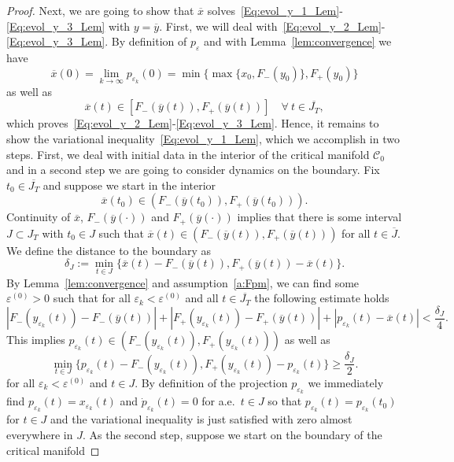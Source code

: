 \documentclass[12pt]{article}
\newcommand{\be}{\begin{equation}}
\newcommand{\ee}{\end{equation}}
\newcommand{\benn}{\begin{equation*}}
\newcommand{\eenn}{\end{equation*}}
\newcommand{\cC}{{\mathcal C}}  %
\begin{document}
\begin{proof}
Next, we are going to show that $\overline{x}$ 
solves~\eqref{Eq:evol_y_1_Lem}-\eqref{Eq:evol_y_3_Lem} with $y=\overline{y}$. First, we 
will deal with~\eqref{Eq:evol_y_2_Lem}-\eqref{Eq:evol_y_3_Lem}. By definition 
of $p_{\varepsilon}$ and with Lemma~\ref{lem:convergence} we have
\be
\label{eq:convinitial}
\overline{x}(0)=\lim_{k\rightarrow \infty}p_{\varepsilon_k}(0)=
\min\{\max\{x_0, F_-(y_0)\},F_+(y_0)\}
\ee
as well as
\be
\label{eq:convdomain}
\overline{x}(t)\in [F_-(\overline{y}(t)), F_+(\overline{y}(t))]\quad  
\forall\ t\in \overline{J_T},
\ee
which proves~\eqref{Eq:evol_y_2_Lem}-\eqref{Eq:evol_y_3_Lem}. Hence, it remains to show
the variational inequality~\eqref{Eq:evol_y_1_Lem}, which we accomplish in two steps.
First, we deal with initial data in the interior of the critical manifold $\cC_0$
and in a second step we are going to consider dynamics on the boundary. Fix $t_0\in 
\overline{J_T}$ and suppose we start in the interior
\benn
\overline{x}(t_0) \in (F_-(\overline{y}(t_0)),F_+(\overline{y}(t_0))).
\eenn
Continuity of $\overline{x}$, $F_-(\overline{y}(\cdot))$ and $F_+(\overline{y}(\cdot))$ 
implies that there is some interval $J\subset J_T$ with $t_0\in J$ such that 
$\overline{x}(t) \in ( F_-(\overline{y}(t)) , F_+(\overline{y}(t)) )$ for all 
$t\in \overline{J}$. We define the distance to the boundary as
\benn
\delta_J:= \min_{t\in J}\{ \overline{x}(t) - F_-(\overline{y}(t)) , 
F_+(\overline{y}(t)) - \overline{x}(t) \}.
\eenn
By Lemma~\ref{lem:convergence} and assumption~\ref{a:Fpm}, we can find some 
$\varepsilon^{(0)} > 0$ such that for all $\varepsilon_k<\varepsilon^{(0)}$ and 
all $t\in \overline{J_T}$ the following estimate holds
\be
\label{eq:simbelow}
|F_-(y_{\varepsilon_k}(t)) - F_-(\overline{y}(t))| + |F_+(y_{\varepsilon_k}(t)) 
- F_+(\overline{y}(t))| + |p_{\varepsilon_k}(t)-\overline{x}(t)|<\frac{\delta_J}{4}.
\ee
This implies $p_{\varepsilon_k}(t) \in 
( F_-(y_{\varepsilon_k}(t)),F_+(y_{\varepsilon_k}(t)) )$ as well as
\benn
	\min_{t\in J}\{ p_{\varepsilon_k}(t) - F_-(y_{\varepsilon_k}(t)) , 
	F_+(y_{\varepsilon_k}(t)) - p_{\varepsilon_k}(t) \} \geq \frac{\delta_J}{2}.
\eenn
for all $\varepsilon_k<\varepsilon^{(0)}$ and $t\in J$. By definition of the 
projection $p_{\varepsilon_k}$ we immediately find $p_{\varepsilon_k}(t)=
x_{\varepsilon_k}(t)$ and $\dot{p}_{\varepsilon_k}(t)=0$ for a.e.~$t\in J$ 
so that $p_{\varepsilon_k}(t)=p_{\varepsilon_k}(t_0)$ for $t\in J$ and the
variational inequality is just satisfied with zero almost everywhere in $J$.
As the second step, suppose we start on the boundary of the critical manifold

\end{proof}
\end{document}

